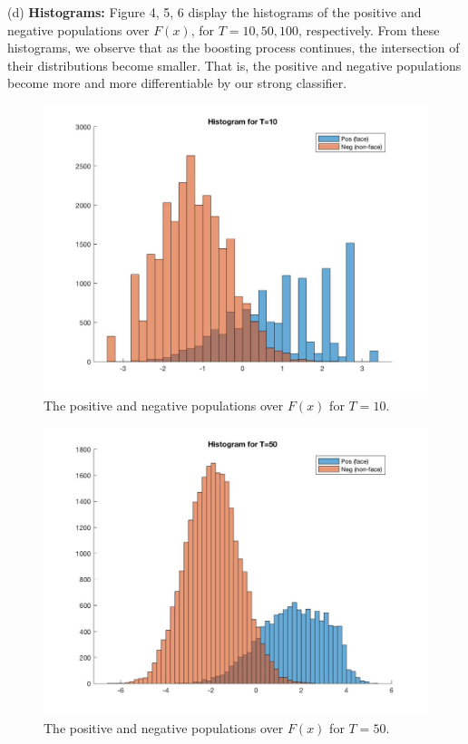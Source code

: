 \documentclass[10pt]{article}
\begin{document}
	(d) \textbf{Histograms:} Figure 4, 5, 6 display the histograms of the positive and negative populations over $F(x)$, for $T=10,50,100$, respectively. From these histograms, we observe that as the boosting process continues, the intersection of their distributions become smaller. That is, the positive and negative populations become more and more differentiable by our strong classifier.\\
	\begin{figure}[ht]
		\includegraphics[scale = 0.2]{pos_neg_hist_10.jpg}
		\centering
		\caption{The positive and negative populations over $F(x)$ for $T=10$.}
		\label{4}
	\end{figure}
	\begin{figure}[ht]
		\includegraphics[scale = 0.2]{pos_neg_hist_50.jpg}
		\centering
		\caption{The positive and negative populations over $F(x)$ for $T=50$.}
		\label{5}
	\end{figure}
\end{document}
